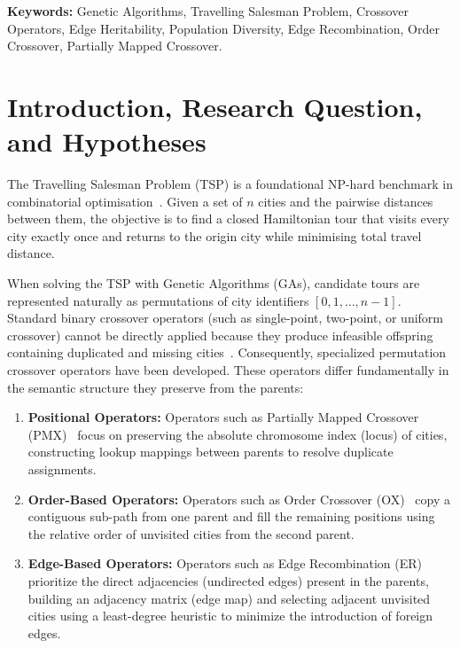 \documentclass[10pt,a4paper]{article}
\begin{document}
\vspace{0.3em}
\noindent\textbf{Keywords:} Genetic Algorithms, Travelling Salesman Problem, Crossover Operators, Edge Heritability, Population Diversity, Edge Recombination, Order Crossover, Partially Mapped Crossover.

\section{Introduction, Research Question, and Hypotheses}
\label{sec:intro}

The Travelling Salesman Problem (TSP) is a foundational NP-hard benchmark in combinatorial optimisation~\cite{papadimitriou1982combinatorial,reinelt1991tsplib}. Given a set of $n$ cities and the pairwise distances between them, the objective is to find a closed Hamiltonian tour that visits every city exactly once and returns to the origin city while minimising total travel distance.

When solving the TSP with Genetic Algorithms (GAs), candidate tours are represented naturally as permutations of city identifiers $[0, 1, \dots, n-1]$. Standard binary crossover operators (such as single-point, two-point, or uniform crossover) cannot be directly applied because they produce infeasible offspring containing duplicated and missing cities~\cite{goldberg1989genetic,larranaga1999genetic}. Consequently, specialized permutation crossover operators have been developed. These operators differ fundamentally in the semantic structure they preserve from the parents:
\begin{enumerate}
    \item \textbf{Positional Operators:} Operators such as Partially Mapped Crossover (PMX)~\cite{goldberg1985alleles} focus on preserving the absolute chromosome index (locus) of cities, constructing lookup mappings between parents to resolve duplicate assignments.
    \item \textbf{Order-Based Operators:} Operators such as Order Crossover (OX)~\cite{davis1985applying} copy a contiguous sub-path from one parent and fill the remaining positions using the relative order of unvisited cities from the second parent.
    \item \textbf{Edge-Based Operators:} Operators such as Edge Recombination (ER)~\cite{whitley1989scheduling} prioritize the direct adjacencies (undirected edges) present in the parents, building an adjacency matrix (edge map) and selecting adjacent unvisited cities using a least-degree heuristic to minimize the introduction of foreign edges.
\end{enumerate}
\end{document}
